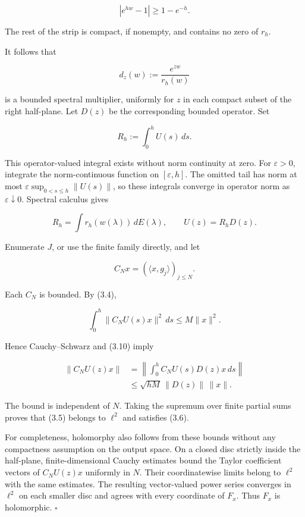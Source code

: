 \documentclass[
  11pt,
]{article}
\begin{document}
\[
|e^{hw}-1|\geq1-e^{-h}.
\]

The rest of the strip is compact, if nonempty, and contains no zero of
\(r_h\).

It follows that

\[
d_z(w):=\frac{e^{zw}}{r_h(w)}                    \tag{3.9}
\]

is a bounded spectral multiplier, uniformly for \(z\) in each compact
subset of the right half-plane. Let \(D(z)\) be the corresponding
bounded operator. Set

\[
R_h:=\int_0^h U(s)\,ds.
\]

This operator-valued integral exists without norm continuity at zero.
For \(\varepsilon>0\), integrate the norm-continuous function on
\([\varepsilon,h]\). The omitted tail has norm at most
\(\varepsilon\sup_{0<s\leq h}\|U(s)\|\), so these integrals converge in
operator norm as \(\varepsilon\downarrow0\). Spectral calculus gives

\[
R_h=\int r_h(w(\lambda))\,dE(\lambda),
\qquad U(z)=R_hD(z).                             \tag{3.10}
\]

Enumerate \(J\), or use the finite family directly, and let

\[
C_Nx=(\langle x,g_j\rangle)_{j\leq N}.
\]

Each \(C_N\) is bounded. By (3.4),

\[
\int_0^h\|C_NU(s)x\|^2\,ds\leq M\|x\|^2.
\]

Hence Cauchy--Schwarz and (3.10) imply

\[
\begin{aligned}
\|C_NU(z)x\|
&=\left\|\int_0^h C_NU(s)D(z)x\,ds\right\|\\
&\leq\sqrt{hM}\,\|D(z)\|\,\|x\|.
\end{aligned}                                   \tag{3.11}
\]

The bound is independent of \(N\). Taking the supremum over finite
partial sums proves that (3.5) belongs to \(\ell^2\) and satisfies
(3.6).

For completeness, holomorphy also follows from these bounds without any
compactness assumption on the output space. On a closed disc strictly
inside the half-plane, finite-dimensional Cauchy estimates bound the
Taylor coefficient vectors of \(C_NU(z)x\) uniformly in \(N\). Their
coordinatewise limits belong to \(\ell^2\) with the same estimates. The
resulting vector-valued power series converges in \(\ell^2\) on each
smaller disc and agrees with every coordinate of \(F_x\). Thus \(F_x\)
is holomorphic. \(\square\)
\end{document}
